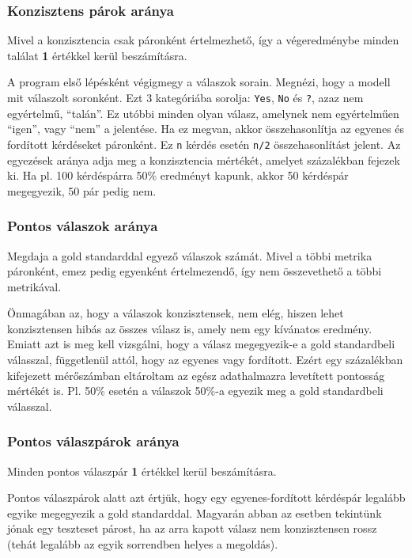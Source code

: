 \documentclass[12pt]{report}
\begin{document}
    \subsubsection{Konzisztens párok aránya}
    Mivel a konzisztencia csak páronként értelmezhető, így a végeredménybe minden találat \textbf{1} értékkel kerül beszámításra.

    A program első lépésként végigmegy a válaszok sorain.
    Megnézi, hogy a modell mit válaszolt soronként.
    Ezt 3 kategóriába sorolja: \texttt{\allowbreak Yes}, \texttt{\allowbreak No} és \texttt{\allowbreak ?}, azaz nem egyértelmű, ``talán''.
    Ez utóbbi minden olyan válasz, amelynek nem egyértelműen ``igen'', vagy ``nem'' a jelentése.
    Ha ez megvan, akkor összehasonlítja az egyenes és fordított kérdéseket páronként.
    Ez \texttt{\allowbreak n} kérdés esetén \texttt{\allowbreak n/2} összehasonlítást jelent.
    Az egyezések aránya adja meg a konzisztencia mértékét, amelyet százalékban fejezek ki.
    Ha pl. 100 kérdéspárra 50\% eredményt kapunk, akkor 50 kérdéspár megegyezik, 50 pár pedig nem.


    \subsubsection{Pontos válaszok aránya}
    Megdaja a gold standarddal egyező válaszok számát.
    Mivel a többi metrika páronként, emez pedig egyenként értelmezendő, így nem összevethető a többi metrikával.

    Önmagában az, hogy a válaszok konzisztensek, nem elég, hiszen lehet konzisztensen hibás az összes válasz is, amely nem egy kívánatos eredmény.
    Emiatt azt is meg kell vizsgálni, hogy a válasz megegyezik-e a gold standardbeli válasszal, függetlenül attól, hogy az egyenes vagy fordított.
    Ezért egy százalékban kifejezett mérőszámban eltároltam az egész adathalmazra levetített pontosság mértékét is.
    Pl. 50\% esetén a válaszok 50\%-a egyezik meg a gold standardbeli válasszal.

    \subsubsection{Pontos válaszpárok aránya}
    Minden pontos válaszpár \textbf{1} értékkel kerül beszámításra.

    Pontos válaszpárok alatt azt értjük, hogy egy egyenes-fordított kérdéspár legalább egyike megegyezik a gold standarddal.
    Magyarán abban az esetben tekintünk jónak egy teszteset párost, ha az arra kapott válasz nem konzisztensen rossz (tehát legalább az egyik sorrendben helyes a megoldás).
\end{document}
